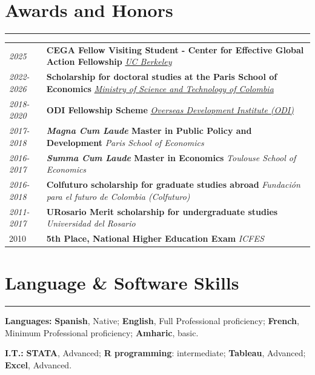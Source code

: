 \documentclass[letterpaper]{article}
\renewenvironment{itemize}{
  \begin{list}{}{
    \setlength{\leftmargin}{1.5em}
  }
}{
  \end{list}
}
\begin{document}
\section*{\textbf{Awards and Honors}}
\hrule
\begin{tabular}{p{4cm} p{12cm}}
\textit{2025} & \textbf{CEGA Fellow Visiting Student - Center for Effective Global Action Fellowship} \newline \href{https://cega.berkeley.edu/}{\textit{UC Berkeley}} \\  
\textit{2022-2026} & \textbf{Scholarship for doctoral studies at the Paris School of Economics } \newline \href{https://colfuturo.org}{\textit{Ministry of Science and Technology of Colombia}}  \\
\textit{2018-2020} & \textbf{ODI Fellowship Scheme} \newline  \href{https://odi.org/en/odi-fellowship-scheme/}{\textit{Overseas Development Institute (ODI)}} \\
\textit{2017-2018} & \textbf{\textit{Magna Cum Laude} Master in Public Policy and Development} \newline \textit{Paris School of Economics} \\
\textit{2016-2017} & \textbf{\textit{Summa Cum Laude} Master in Economics} \newline \textit{Toulouse School of Economics} \\
\textit{2016-2018 } & \textbf{Colfuturo scholarship for graduate studies abroad }\newline \textit{Fundaci\'on para el futuro de Colombia (Colfuturo)} \\
\textit{2011-2017} & \textbf{URosario Merit scholarship for undergraduate studies} \newline \textit{Universidad del Rosario} \\
2010 & \textbf{5th Place, National Higher Education Exam} \newline \textit{ICFES}
\end{tabular}

\section*{\textbf{ Language \& Software Skills }}
\hrule
\begin{itemize}


\item \textbf{Languages:} \textbf{Spanish}, Native; \textbf{English}, Full Professional proficiency; \textbf{French}, Minimum Professional proficiency; \textbf{Amharic}, basic. 

\item \textbf{I.T.:} \textbf{STATA}, Advanced;  \textbf{R programming}: intermediate; \textbf{Tableau}, Advanced; \textbf{Excel}, Advanced.
\end{itemize}
\end{document}
